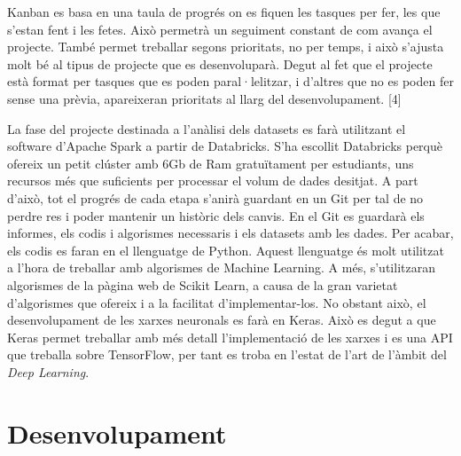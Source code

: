 \documentclass[10pt,a4paper,twocolumn,twoside]{article}
\begin{document}
Kanban es basa en una taula de progrés on es fiquen les tasques per fer, les que s'estan fent i les fetes. Això permetrà un seguiment constant de com avança el projecte. També permet treballar segons prioritats, no per temps, i això s'ajusta molt bé al tipus de projecte que es desenvoluparà. Degut al fet que el projecte està format per tasques que es poden paral·lelitzar, i d'altres que no es poden fer sense una prèvia, apareixeran prioritats al llarg del desenvolupament. [4]

La fase del projecte destinada a l'anàlisi dels datasets es farà utilitzant el software d'Apache Spark a partir de Databricks. S'ha escollit Databricks perquè ofereix un petit clúster amb 6Gb de Ram gratuïtament per estudiants, uns recursos més que suficients per processar el volum de dades desitjat.
A part d'això, tot el progrés de cada etapa s'anirà guardant en un Git per tal de no perdre res i poder mantenir un històric dels canvis. En el Git es guardarà els informes, els codis i algorismes necessaris i els datasets amb les dades.
Per acabar, els codis es faran en el llenguatge de Python. Aquest llenguatge és molt utilitzat a l'hora de treballar amb algorismes de Machine Learning. A més, s'utilitzaran algorismes de la pàgina web de Scikit Learn, a causa de la gran varietat d'algorismes que ofereix i a la facilitat d'implementar-los. No obstant això, el desenvolupament de les xarxes neuronals es farà en Keras. Això es degut a que Keras permet treballar amb més detall l'implementació de les xarxes i es una API que treballa sobre TensorFlow, per tant es troba en l'estat de l'art de l'àmbit del \textit{Deep Learning}.
\section {Desenvolupament}
\end{document}

